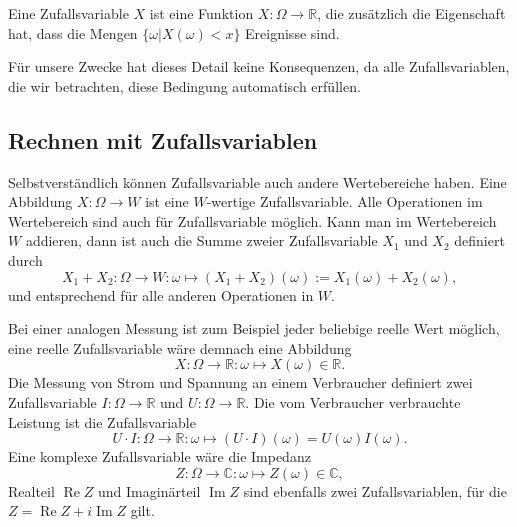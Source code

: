 \begin{definition}
Eine Zufallsvariable $X$ ist eine Funktion $X\colon \Omega\to \mathbb R$,
die zusätzlich die Eigenschaft hat, dass die Mengen 
$\{\omega | X(\omega) < x\}$ Ereignisse sind.
\end{definition}

Für unsere Zwecke hat dieses Detail keine Konsequenzen, da alle Zufallsvariablen,
die wir betrachten, diese Bedingung automatisch erfüllen.

\subsection{Rechnen mit Zufallsvariablen}
Selbstverständlich können Zufallsvariable auch andere Wertebereiche haben.
Eine Abbildung $X:\Omega\to W$ ist eine $W$-wertige Zufallsvariable.
Alle Operationen im Wertebereich sind auch für Zufallsvariable möglich.
Kann man im Wertebereich $W$ addieren, dann ist auch die Summe zweier
Zufallsvariable $X_1$ und $X_2$ definiert durch
\[
X_1+X_2:\Omega\to W:\omega\mapsto(X_1+X_2)(\omega) := X_1(\omega) + X_2(\omega),
\]
und entsprechend für alle anderen Operationen in $W$.

Bei einer analogen Messung ist zum Beispiel jeder beliebige reelle
Wert möglich, eine reelle Zufallsvariable wäre demnach eine Abbildung
\[
X:\Omega\to\mathbb R:\omega\mapsto X(\omega)\in\mathbb R.
\]
Die Messung von Strom und Spannung an einem Verbraucher definiert zwei
Zufallsvariable $I:\Omega\to\mathbb R$ und $U:\Omega\to \mathbb R$.
Die vom Verbraucher verbrauchte Leistung ist die Zufallsvariable
\[
U\cdot I:\Omega\to\mathbb R: \omega\mapsto (U\cdot I)(\omega) = U(\omega)I(\omega).
\]
Eine komplexe Zufallsvariable wäre die Impedanz
\[
Z:\Omega\to\mathbb C:\omega\mapsto Z(\omega)\in\mathbb C,
\]
Realteil $\operatorname{Re}Z$ und Imaginärteil $\operatorname{Im}Z$
sind ebenfalls zwei Zufallsvariablen,
für die $Z=\operatorname{Re}Z + i \operatorname{Im}Z$ gilt.


